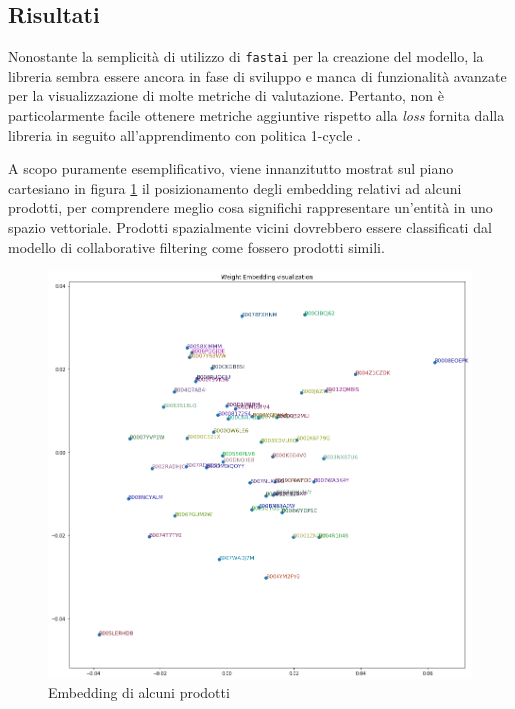 \documentclass[hidelinks, 12pt]{article}
\begin{document}
\subsection{Risultati}

Nonostante la semplicità di utilizzo di \texttt{fastai} per la creazione del modello, la libreria sembra essere ancora in fase di sviluppo e manca di funzionalità avanzate per la visualizzazione di molte metriche di valutazione. Pertanto, non è particolarmente facile ottenere metriche aggiuntive rispetto alla \textit{loss} fornita dalla libreria in seguito all'apprendimento con politica 1-cycle \cite{site:1cycle}.

A scopo puramente esemplificativo, viene innanzitutto mostrat sul piano cartesiano in figura \ref{fig:embedding-chart} il posizionamento degli embedding relativi ad alcuni prodotti, per comprendere meglio cosa significhi rappresentare un'entità in uno spazio vettoriale. Prodotti spazialmente vicini dovrebbero essere classificati dal modello di collaborative filtering come fossero prodotti simili.

\begin{figure}[H]
	\centering
	\includegraphics[scale=0.30]{images/07_04_embeddings.png}
	\caption[Embedding di alcuni prodotti]{Embedding di alcuni prodotti}
	\label{fig:embedding-chart}
\end{figure}
\end{document}
